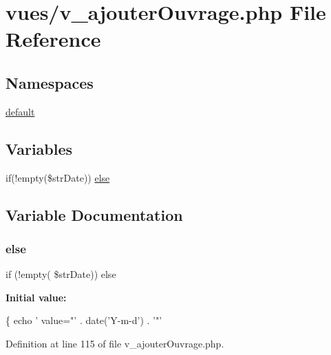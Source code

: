 \hypertarget{v__ajouter_ouvrage_8php}{}\section{vues/v\+\_\+ajouter\+Ouvrage.php File Reference}
\label{v__ajouter_ouvrage_8php}
\subsection*{Namespaces}
\begin{DoxyCompactItemize}
\item 
 \hyperlink{namespacedefault}{default}
\end{DoxyCompactItemize}
\subsection*{Variables}
\begin{DoxyCompactItemize}
\item 
if(!empty(\$str\+Date)) \hyperlink{v__ajouter_ouvrage_8php_a2b79d4dedb9d26f441441aa4d9ded641}{else}
\end{DoxyCompactItemize}


\subsection{Variable Documentation}
\mbox{\label{v__ajouter_ouvrage_8php_a2b79d4dedb9d26f441441aa4d9ded641}} 
\subsubsection{\texorpdfstring{else}{else}}
{\footnotesize\ttfamily if (!empty( \$str\+Date)) else}

{\bfseries Initial value\+:}
\begin{DoxyCode}
\{
                                        echo \textcolor{stringliteral}{' value="'} . date(\textcolor{stringliteral}{'Y-m-d'}) . \textcolor{charliteral}{'"'}
\end{DoxyCode}


Definition at line 115 of file v\+\_\+ajouter\+Ouvrage.\+php.

